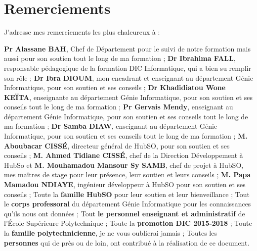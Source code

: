 %
%

\chapter*{Remerciements}
J’adresse mes remerciements les plus chaleureux à : \\
\begin{itemize}
	\itemcheck \textbf{Pr Alassane BAH}, Chef de Département pour le suivi de notre formation mais aussi pour son soutien tout le long de ma formation ;
	\itemcheck \textbf{Dr Ibrahima FALL}, responsable pédagogique de la formation DIC Informatique, qui a bien su remplir son rôle ;
	\itemcheck \textbf{Dr Ibra DIOUM}, mon encadrant et enseignant au département Génie Informatique, pour son soutien et ses conseils ;
	\itemcheck \textbf{Dr Khadidiatou Wone KEÏTA}, enseignante au département Génie Informatique, pour son soutien et
	ses conseils tout le long de ma formation ;
	\itemcheck \textbf{Pr Gervais Mendy}, enseignant au département Génie Informatique, pour son soutien et
	ses conseils tout le long de ma formation ;
	\itemcheck \textbf{Dr Samba DIAW}, enseignant au département Génie Informatique, pour son soutien et
	ses conseils tout le long de ma formation ;
	\itemcheck \textbf{M. Aboubacar CISSÉ}, directeur général de HubSO, pour son soutien et ses conseils ;
	\itemcheck \textbf{M. Ahmed Tidiane CISSÉ}, chef de la Direction Développement à HubSo et \textbf{M. Mouhamadou Mansour Sy SAMB}, chef de projet à HubSO, mes maîtres de stage pour leur présence, leur soutien et leurs conseils ;
	\itemcheck \textbf{M. Papa Mamadou NDIAYE}, ingénieur développeur à HubSO pour son soutien et ses conseils ;
	\itemcheck Toute la \textbf{famille HubSO} pour leur soutien et leur bienveillance ;
	\itemcheck Tout le \textbf{corps professoral} du département Génie Informatique pour les connaissances qu’ils nous ont données ;
	\itemcheck Tout \textbf{le personnel enseignant et administratif} de l’École Supérieure Polytechnique ;
	\itemcheck Toute la \textbf{promotion DIC 2015-2018} ;
	\itemcheck Toute la \textbf{famille polytechnicienne}, je ne vous oublierai jamais ;
	\itemcheck Toutes les \textbf{personnes} qui de près ou de loin, ont contribué à la réalisation de ce document.
\end{itemize}

\clearpage